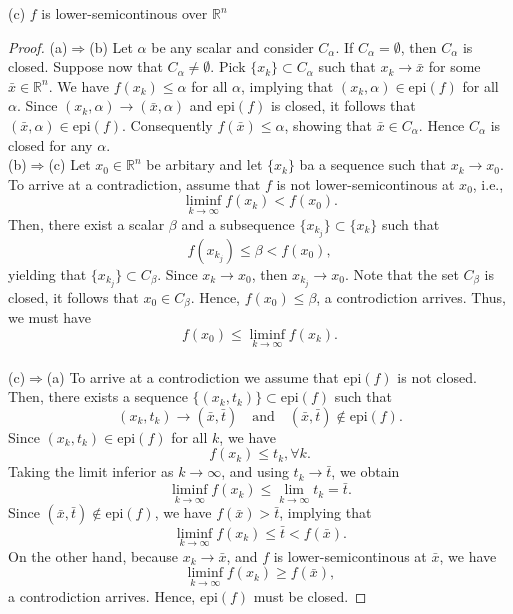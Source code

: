\noindent (c) $f$ is lower-semicontinous over ${\mathbb R}^n$
\begin{proof}
(a)$\Rightarrow$(b) Let $\alpha$ be any scalar and consider $C_\alpha$. If $C_\alpha=\emptyset$, then $C_\alpha$ is closed. Suppose now that $C_\alpha\neq\emptyset$. Pick $\{x_k\}\subset C_\alpha$ such that $x_k \rightarrow \bar x$ for some $\bar x \in {\mathbb R}^n$. We have $f(x_k)\leq\alpha$ for all $\alpha$, implying that $(x_k, \alpha)\in \mathrm{epi}(f)$ for all $\alpha$. Since $(x_k, \alpha) \rightarrow (\bar x, \alpha)$ and $\mathrm{epi}(f)$ is closed, it follows that $(\bar x, \alpha) \in \mathrm{epi}(f)$. Consequently $f(\bar x)\leq\alpha$, showing that $\bar x \in C_\alpha$. Hence $C_\alpha$ is closed for any $\alpha$.\\

\noindent (b)$\Rightarrow$(c) Let $x_0 \in {\mathbb R}^n$ be arbitary and let $\{x_k\}$ ba a sequence such that $x_k \rightarrow x_0$. To arrive at a contradiction, assume that $f$ is not lower-semicontinous at $x_0$, i.e.,
$$\mathop{\lim\inf}\limits_{k \rightarrow \infty} f(x_k) < f(x_0).$$
Then, there exist a scalar $\beta$ and a subsequence $\{x_{k_j}\}\subset \{x_k\}$ such that
$$f(x_{k_j})\leq\beta < f(x_0),$$
yielding that $\{x_{k_j}\} \subset C_\beta$. Since $x_k \rightarrow x_0$, then $x_{k_j}\rightarrow x_0$. Note that the set $C_\beta$ is closed, it follows that $x_0 \in C_\beta$. Hence, $f(x_0)\leq\beta$, a controdiction arrives. Thus, we must have
$$f(x_0)\leq\mathop{\lim\inf}\limits_{k \rightarrow \infty} f(x_k).$$
\\
\noindent (c)$\Rightarrow$(a) To arrive at a controdiction we assume that $\mathrm{epi}(f)$ is not closed. Then, there exists a sequence $\{(x_k, t_k)\}\subset \mathrm{epi}(f)$ such that 
$$(x_k, t_k) \rightarrow (\bar x, \bar t) \quad\text{and}\quad (\bar x, \bar t) \notin \mathrm{epi}(f).$$
Since $(x_k, t_k) \in \mathrm{epi}(f)$ for all $k$, we have
$$f(x_k) \leq t_k, \forall k.$$
Taking the limit inferior as $k \rightarrow \infty$, and using $t_k \rightarrow \bar t$, we obtain
$$\mathop{\lim\inf}\limits_{k \rightarrow \infty} f(x_k) \leq \lim\limits_{k \rightarrow \infty} t_k = \bar t.$$
Since $(\bar x, \bar t) \notin \mathrm{epi}(f)$, we have $f(\bar x) > \bar t$, implying that
$$\mathop{\lim\inf}\limits_{k \rightarrow \infty} f(x_k) \leq \bar t < f(\bar x).$$
On the other hand, because $x_k \rightarrow \bar x$, and $f$ is lower-semicontinous at $\bar x$, we have
$$\mathop{\lim\inf}\limits_{k \rightarrow \infty} f(x_k)\geq f(\bar x),$$
a controdiction arrives. Hence, $\mathrm{epi}(f)$ must be closed.

\end{proof}

